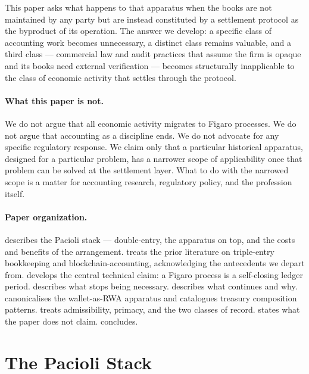 \documentclass[11pt,a4paper]{article}
\theoremstyle{definition}
\theoremstyle{remark}
\begin{document}
This paper asks what happens to that apparatus when the books
are not maintained by any party but are instead constituted by
a settlement protocol as the byproduct of its operation. The
answer we develop: a specific class of accounting work becomes
unnecessary, a distinct class remains valuable, and a third
class --- commercial law and audit practices that assume the
firm is opaque and its books need external verification ---
becomes structurally inapplicable to the class of economic
activity that settles through the protocol.

\paragraph{What this paper is not.}
We do not argue that all economic activity migrates to Figaro
processes. We do not argue that accounting as a discipline
ends. We do not advocate for any specific regulatory response.
We claim only that a particular historical apparatus, designed
for a particular problem, has a narrower scope of
applicability once that problem can be solved at the
settlement layer. What to do with the narrowed scope is a
matter for accounting research, regulatory policy, and the
profession itself.

\paragraph{Paper organization.}
 describes the Pacioli stack ---
double-entry, the apparatus on top, and the costs and benefits
of the arrangement.  treats the prior
literature on triple-entry bookkeeping and blockchain-accounting,
acknowledging the antecedents we depart from. 
develops the central technical claim: a Figaro process is a
self-closing ledger period.  describes what
stops being necessary.  describes what
continues and why.  canonicalises
the wallet-as-RWA apparatus and catalogues treasury composition
patterns.  treats admissibility,
primacy, and the two classes of record.  states
what the paper does not claim.  concludes.

\section{The Pacioli Stack}
\label{sec:pacioli-stack}
\end{document}
